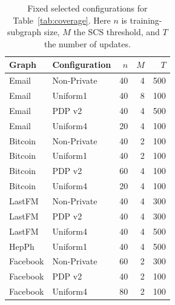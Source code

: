 \begin{table}[htbp]
\centering\small
\caption{Fixed selected configurations for Table~\ref{tab:coverage}. Here $n$ is training-subgraph size, $M$ the SCS threshold, and $T$ the number of updates.}\label{tab:frozenparams}
\begin{tabular}{llrrr}
\toprule
Graph & Configuration & $n$ & $M$ & $T$\\ \midrule
Email & Non-Private & 40 & 4 & 500 \\
Email & Uniform1 & 40 & 8 & 100 \\
Email & PDP v2 & 40 & 4 & 500 \\
Email & Uniform4 & 20 & 4 & 100 \\
Bitcoin & Non-Private & 40 & 2 & 100 \\
Bitcoin & Uniform1 & 40 & 2 & 100 \\
Bitcoin & PDP v2 & 60 & 4 & 100 \\
Bitcoin & Uniform4 & 20 & 4 & 100 \\
LastFM & Non-Private & 40 & 4 & 300 \\
LastFM & PDP v2 & 40 & 4 & 300 \\
LastFM & Uniform4 & 40 & 4 & 500 \\
HepPh & Uniform1 & 40 & 4 & 500 \\
Facebook & Non-Private & 60 & 2 & 300 \\
Facebook & PDP v2 & 40 & 2 & 100 \\
Facebook & Uniform4 & 80 & 2 & 100 \\
\bottomrule\end{tabular}
\end{table}
